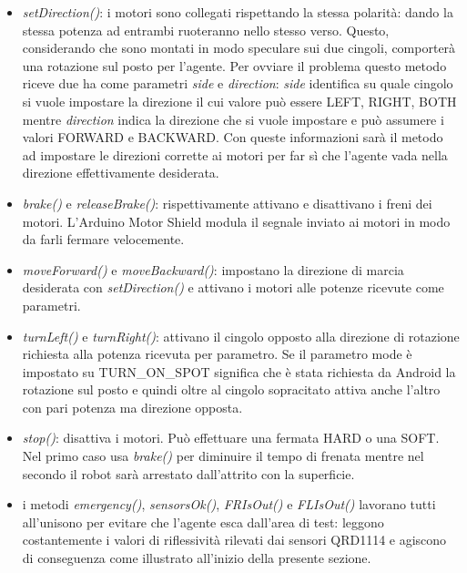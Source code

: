 \begin{itemize}
\item \emph{setDirection()}: i motori sono collegati rispettando la stessa 
polarità: dando la stessa potenza ad entrambi ruoteranno nello stesso verso. 
Questo, considerando che sono montati in modo speculare sui due cingoli,
comporterà una rotazione sul posto per l'agente. Per ovviare 
il problema questo metodo riceve due ha come parametri \emph{side} e \emph{direction}: 
\emph{side} identifica su quale cingolo si vuole impostare la direzione il cui valore 
può essere LEFT, RIGHT, BOTH mentre \emph{direction} indica la direzione che si 
vuole impostare e può assumere i valori FORWARD e BACKWARD.
Con queste informazioni sarà il metodo ad impostare le direzioni corrette ai motori 
per far sì che l'agente vada nella direzione effettivamente desiderata.
\item \emph{brake()} e \emph{releaseBrake()}: rispettivamente attivano e disattivano i 
freni dei motori. L'Arduino Motor Shield modula il segnale inviato ai motori in 
modo da farli fermare velocemente.
\item \emph{moveForward()} e \emph{moveBackward()}: impostano la direzione di marcia 
desiderata con \emph{setDirection()} e attivano i motori alle potenze ricevute come 
parametri.
\item \emph{turnLeft()} e \emph{turnRight()}: attivano il cingolo opposto alla 
direzione di rotazione richiesta alla potenza ricevuta per parametro. Se il  parametro
mode è impostato su TURN\_ON\_SPOT significa che è stata richiesta da Android la 
rotazione sul posto e quindi oltre al cingolo sopracitato attiva anche l'altro 
con pari potenza ma direzione opposta.
\item \emph{stop()}: disattiva i motori. Può effettuare una fermata HARD o una SOFT.
Nel primo caso usa \emph{brake()} per diminuire il tempo di frenata mentre nel 
secondo il robot sarà arrestato dall'attrito con la superficie.
\item i metodi \emph{emergency()}, \emph{sensorsOk()}, \emph{FRIsOut()} e \emph{FLIsOut()}
lavorano tutti all'unisono per evitare che l'agente esca dall'area di test: leggono costantemente 
i valori di riflessività rilevati dai sensori QRD1114 e agiscono di conseguenza come 
illustrato all'inizio della presente sezione. 
\end{itemize}
